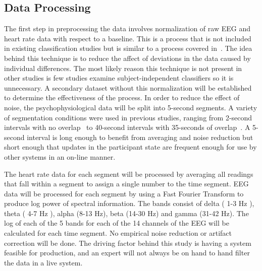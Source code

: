 \documentclass[11pt]{article}
\begin{document}
\subsection{Data Processing}
The first step in preprocessing the data involves normalization of raw EEG and heart rate data with respect to a baseline. This is a process that is not included in existing classification studies but is similar to a process covered in~\cite{Smith}. The idea behind this technique is to reduce the affect of deviations in the data caused by individual differences. The most likely reason this technique is not present in other studies is few studies examine subject-independent classifiers so it is unnecessary. A secondary dataset without this normalization will be established to determine the effectiveness of the process. In order to reduce the effect of noise, the psychophysiological data will be split into 5-second segments. A variety of segmentation conditions were used in previous studies, ranging from 2-second intervals with no overlap~\cite{Smith} to 40-second intervals with 35-seconds of overlap~\cite{Wang_Z}. A 5-second interval is long enough to benefit from averaging and noise reduction but short enough that updates in the participant state are frequent enough for use by other systems in an on-line manner. 

The heart rate data for each segment will be processed by averaging all readings that fall within a segment to assign a single number to the time segment. EEG data will be processed for each segment by using a Fast Fourier Transform to produce log power of spectral information. The bands consist of delta ( 1-3 Hz ), theta ( 4-7 Hz ), alpha (8-13 Hz), beta (14-30 Hz) and gamma (31-42 Hz). The log of each of the 5 bands for each of the 14 channels of the EEG will be calculated for each time segment. No empirical noise reduction or artifact correction will be done. The driving factor behind this study is having a system feasible for production, and an expert will not always be on hand to hand filter the data in a live system.
\end{document}
